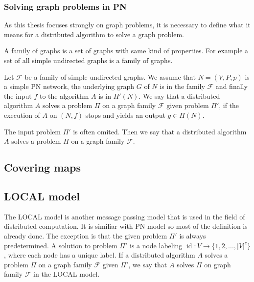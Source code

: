 
\subsubsection{Solving graph problems in PN}
As this thesis focuses strongly on graph problems, it is necessary to define what it means for a distributed algorithm to solve a graph problem.

A family of graphs is a set of graphs with same kind of properties.
For example a set of all simple undirected graphs is a family of graphs.

Let $\mathcal{F}$ be a family of simple undirected graphs.
We assume that $N=(V, P, p)$ is a simple PN network, the underlying graph $G$ of $N$ is in the family $\mathcal{F}$ and finally the input $f$ to the algorithm $A$ is in $\Pi'(N)$.
We say that a distributed algorithm $A$ solves a problem $\Pi$ on a graph family $\mathcal{F}$ given problem $\Pi'$, if the execution of $A$ on $(N, f)$ stops and yields an output $g \in \Pi(N)$.

The input problem $\Pi'$ is often omited.
Then we say that a distributed algorithm $A$ solves a problem $\Pi$ on a graph family $\mathcal{F}$.



\subsection{Covering maps}

\subsection{LOCAL model} \label{sec:local_model}
The LOCAL model is another message passing model that is used in the field of distributed computation.
It is similiar with PN model so most of the definition is already done.
The exception is that the given problem $\Pi'$ is always predetermined.
A solution to problem $\Pi'$ is a node labeling $\operatorname{id}: V \rightarrow \{1,2,...,|V|^c\}$, where each node has a unique label.
If a distributed algorithm $A$ solves a problem $\Pi$ on a graph family $\mathcal{F}$ given $\Pi'$, we say that $A$ solves $\Pi$ on graph family $\mathcal{F}$ in the LOCAL model.

